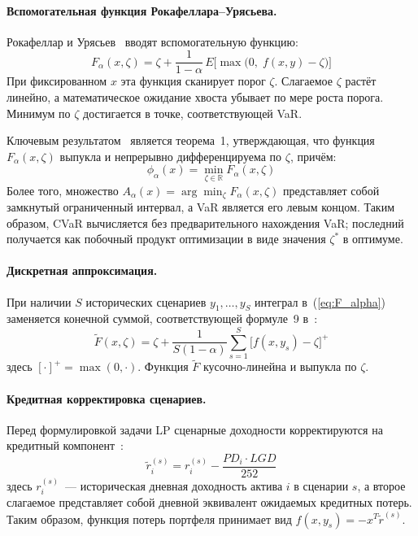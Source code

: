 \documentclass[]{article}
\begin{document}
	\paragraph{Вспомогательная функция Рокафеллара--Урясьева.}
	Рокафеллар и Урясьев~\cite{rockafellar2000} вводят вспомогательную функцию:
	\begin{equation}
		\label{eq:F_alpha}
		F_\alpha(x, \zeta) = \zeta + \frac{1}{1-\alpha}\, E\bigl[\max\bigl(0,\; f(x, y) - \zeta\bigr)\bigr]
	\end{equation}
	При фиксированном $x$ эта функция сканирует порог $\zeta$. Слагаемое $\zeta$ растёт линейно, а
	математическое ожидание хвоста убывает по мере роста порога. Минимум по $\zeta$ достигается
	в точке, соответствующей VaR.

	Ключевым результатом~\cite{rockafellar2000} является теорема~1, утверждающая, что функция
	$F_\alpha(x, \zeta)$ выпукла и непрерывно дифференцируема по $\zeta$, причём:
	\begin{equation}
		\label{eq:cvar_via_F}
		\phi_\alpha(x) = \min_{\zeta \in \mathbb{R}} F_\alpha(x, \zeta)
	\end{equation}
	Более того, множество $A_\alpha(x) = \arg\min_\zeta F_\alpha(x, \zeta)$ представляет собой
	замкнутый ограниченный интервал, а VaR является его левым концом. Таким образом, CVaR
	вычисляется без предварительного нахождения VaR; последний получается как побочный продукт
	оптимизации в виде значения $\zeta^{*}$ в оптимуме.

	\paragraph{Дискретная аппроксимация.}
	При наличии $S$ исторических сценариев $y_1, \ldots, y_S$ интеграл в~(\ref{eq:F_alpha})
	заменяется конечной суммой, соответствующей формуле~9 в~\cite{rockafellar2000}:
	\begin{equation}
		\label{eq:F_discrete}
		\tilde{F}(x, \zeta) = \zeta + \frac{1}{S(1-\alpha)} \sum_{s=1}^{S}
		\bigl[f(x, y_s) - \zeta\bigr]^+
	\end{equation}
	здесь $[\cdot]^+ = \max(0, \cdot)$. Функция $\tilde{F}$ кусочно-линейна и выпукла по $\zeta$.

	\paragraph{Кредитная корректировка сценариев.}
	Перед формулировкой задачи LP сценарные доходности корректируются на кредитный
	компонент~\cite{mausser2008}:
	\begin{equation}
		\label{eq:cvar_adj_returns}
		\tilde{r}_i^{(s)} = r_i^{(s)} - \frac{PD_i \cdot LGD}{252}
	\end{equation}
	здесь $r_i^{(s)}$~--- историческая дневная доходность актива $i$ в сценарии $s$, а второе
	слагаемое представляет собой дневной эквивалент ожидаемых кредитных потерь. Таким образом,
	функция потерь портфеля принимает вид $f(x, y_s) = -x^T \tilde{r}^{(s)}$.
\end{document}
